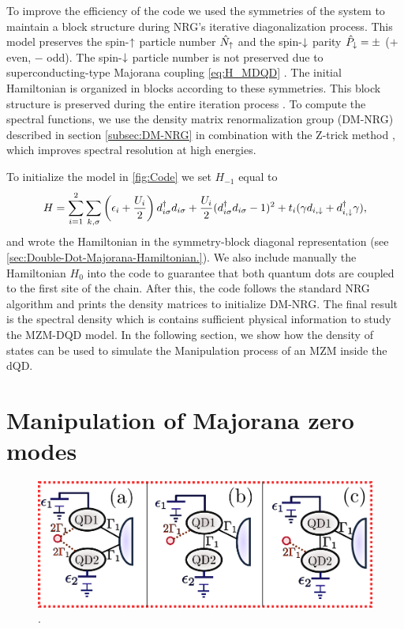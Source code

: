 

To  improve the efficiency of the code we used the symmetries of the system to maintain a block structure during NRG's iterative diagonalization process. This model preserves the spin-$\uparrow$ particle number $\hat{N}_\uparrow$ and the spin-$\downarrow$ parity $\hat{P}_\downarrow = \pm $ ($+$ even, $-$ odd). The spin-$\downarrow$ particle number is not preserved due to superconducting-type Majorana coupling  \eqref{eq:H_MDQD} . The initial Hamiltonian is organized in blocks according to these symmetries. This block structure is preserved during the entire iteration process \cite{bulla_numerical_2008}. To compute the spectral functions, we use the density matrix renormalization group (DM-NRG) described in section \ref{subsec:DM-NRG} in combination with the Z-trick method \cite{oliveira_generalized_1994}, which improves spectral resolution at high energies.


To initialize the model in \ref{fig:Code} we set $H_{-1}$ equal to 
\begin{equation}
H =\sum_{i=1}^2\sum_{k,\sigma}\left(\epsilon_{i}+\frac{U_i}{2}\right)d_{i\sigma}^{\dagger}d_{i\sigma}+ \frac{U_i}{2}(d_{i \sigma}^{\dagger}d_{i \sigma}-1)^{2} + t_i(\gamma d_{i,\downarrow}+d^\dagger_{i,\downarrow}\gamma),
\end{equation} 
\noindent and wrote the Hamiltonian in the symmetry-block diagonal representation (see \ref{sec:Double-Dot-Majorana-Hamiltonian.}). We also include manually the Hamiltonian $H_0$ into the code to guarantee that both quantum dots are coupled to the first site of the chain. After this, the code follows the standard NRG algorithm and prints the density matrices to initialize DM-NRG. The final result is the spectral density which is contains sufficient physical information to study the MZM-DQD model. In the following section, we show how the density of states can be used to simulate the Manipulation process of an MZM inside the dQD. 




\section{Manipulation of Majorana zero modes}


\begin{figure}[bt]
\centering
\includegraphics[scale=0.7]{IMAGES/DQD-M/3Model.png}
\caption{\label{fig:MajoranaModels}. \protect{}} 
\end{figure}


